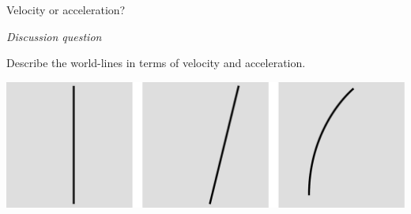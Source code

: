 \begin{frame}{Velocity or acceleration?}

\emph{Discussion question}

Describe the world-lines in terms of velocity and acceleration.

\includegraphics{ch08/figs/velocity-or-acceleration}

\end{frame}
